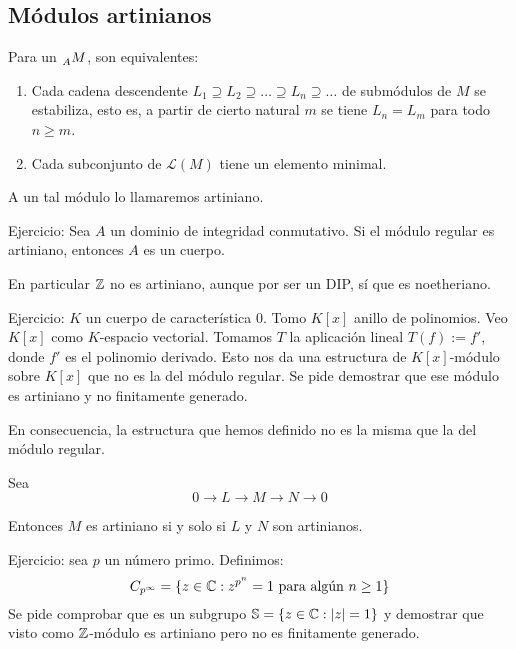 \subsection{Módulos artinianos}

\begin{df}
  Para un \(\prescript{}{A}{M}\), son equivalentes:
  \begin{enumerate}
    \item Cada cadena descendente
      \(L_1\supseteq L_2\supseteq\ldots\supseteq L_n\supseteq\ldots\)
      de submódulos de \(M\)
      se estabiliza, esto es, a partir de cierto natural \(m\)
      se tiene \(L_n=L_m\) para todo \(n\ge m\).
    \item Cada subconjunto de \(\mathcal{L}(M)\) tiene un elemento
      minimal.
  \end{enumerate}
  A un tal módulo lo llamaremos artiniano.
\end{df}

Ejercicio: Sea \(A\) un dominio de integridad conmutativo. Si el
módulo regular es artiniano, entonces \(A\) es un cuerpo.

En particular \(\mathbb{Z}\) no es artiniano, aunque por ser un DIP, sí que
es noetheriano.

Ejercicio: \(K\) un cuerpo de característica 0. Tomo \(K[x]\) anillo
de polinomios. Veo \(K[x]\) como \(K\)-espacio vectorial.
Tomamos \(T\) la aplicación lineal \(T(f):=f'\), donde \(f'\) es el
polinomio derivado. Esto nos da una estructura de \(K[x]\)-módulo
sobre \(K[x]\) que no es la del módulo regular. Se pide demostrar
que ese módulo es artiniano y no finitamente generado.

En consecuencia, la estructura que hemos definido no es la misma
que la del módulo regular.

\begin{prop}
  Sea \[0\longrightarrow L\longrightarrow M\longrightarrow N\longrightarrow
  0\]

  Entonces \(M\) es artiniano si y solo si \(L\) y \(N\) son artinianos.
\end{prop}

Ejercicio: sea \(p\) un número primo. Definimos:
\[
  C_{p^\infty}=\{z\in\mathbb{C}:z^{p^n}=1\textrm{ para algún } n\ge1\}
\]
Se pide comprobar que es un subgrupo \(\mathbb{S}=\{z\in\mathbb{C}:\left|z\right|=1\}\) y demostrar
que visto como \(\mathbb{Z}\)-módulo es artiniano pero no es finitamente generado.

